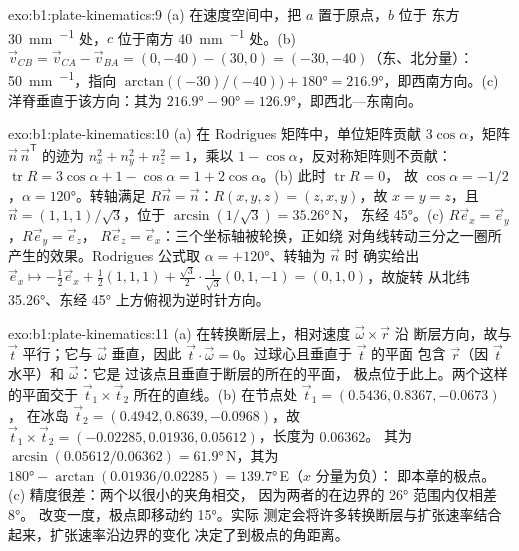 \begin{solution}{exo:b1:plate-kinematics:9}
(a) 在速度空间中，把 $a$ 置于原点，$b$ 位于
东方 \qty{30}{mm.^{-1}} 处，$c$ 位于南方 \qty{40}{mm.^{-1}} 处。(b) $\vec v_{CB} =
\vec v_{CA} - \vec v_{BA} = (0, -40) - (30, 0) = (-30, -40)$（东、北分量）：
\qty{50}{mm.^{-1}}，指向
$\arctan\bigl((-30)/(-40)\bigr) + \ang{180} = \ang{216.9}$，即西南方向。(c)
洋脊垂直于该方向：其为
$\ang{216.9} - \ang{90} = \ang{126.9}$，即西北—东南向。
\end{solution}

\begin{solution}{exo:b1:plate-kinematics:10}
(a) 在 Rodrigues 矩阵中，单位矩阵贡献 $3\cos\alpha$，矩阵
$\vec n\,\vec n^{\mathsf T}$ 的迹为 $n_x^2 + n_y^2 + n_z^2 = 1$，乘以
$1 - \cos\alpha$，反对称矩阵则不贡献：$\operatorname{tr}R =
3\cos\alpha + 1 - \cos\alpha = 1 + 2\cos\alpha$。(b) 此时 $\operatorname{tr}R = 0$，
故 $\cos\alpha = -1/2$，$\alpha = \ang{120}$。转轴满足 $R\vec n =
\vec n$：$R(x, y, z) = (z, x, y)$，故 $x = y = z$，且 $\vec n =
(1, 1, 1)/\sqrt3$，位于 $\arcsin(1/\sqrt3) = \ang{35.26}$\,N，
东经 \ang{45}。(c) $R\vec e_x = \vec e_y$，$R\vec e_y = \vec e_z$，
$R\vec e_z = \vec e_x$：三个坐标轴被轮换，正如绕
对角线转动三分之一圈所产生的效果。Rodrigues 公式取 $\alpha = +\ang{120}$、转轴为 $\vec n$ 时
确实给出 $\vec e_x\mapsto -\tfrac12\vec e_x + \tfrac12(1, 1, 1) +
\tfrac{\sqrt3}{2}\cdot\tfrac{1}{\sqrt3}(0, 1, -1) = (0, 1, 0)$，故旋转
从北纬 \ang{35.26}、东经 \ang{45} 上方俯视为逆时针方向。
\end{solution}

\begin{solution}{exo:b1:plate-kinematics:11}
(a) 在转换断层上，相对速度 $\vec\omega\times\vec r$ 沿
断层方向，故与 $\vec t$ 平行；它与 $\vec\omega$ 垂直，因此
$\vec t\cdot\vec\omega = 0$。过球心且垂直于 $\vec t$ 的平面
包含 $\vec r$（因 $\vec t$ 水平）和 $\vec\omega$：它是
过该点且垂直于断层的所在的平面，
极点位于此上。两个这样的平面交于
$\vec t_1\times\vec t_2$ 所在的直线。(b) 在节点处 $\vec t_1 = (0.5436, 0.8367, -0.0673)$，
在冰岛 $\vec t_2 = (0.4942, 0.8639, -0.0968)$，故
$\vec t_1\times\vec t_2 = (-0.02285, 0.01936, 0.05612)$，长度为 $0.06362$。
其为 $\arcsin(0.05612/0.06362) = \ang{61.9}$\,N，其为
$\ang{180} - \arctan(0.01936/0.02285) = \ang{139.7}$\,E（$x$ 分量为负）：
即本章的极点。(c) 精度很差：两个以很小的夹角相交，
因为两者的在边界的 \ang{26} 范围内仅相差 \ang{8}。
改变一度，极点即移动约 \ang{15}。实际
测定会将许多转换断层与扩张速率结合起来，扩张速率沿边界的变化
决定了到极点的角距离。
\end{solution}

